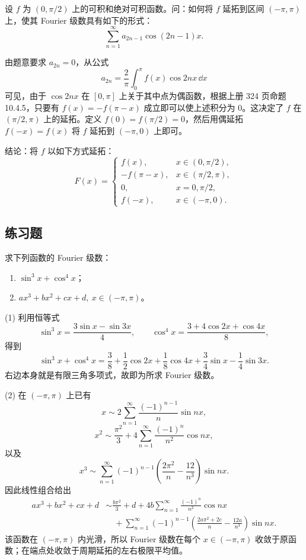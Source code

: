 \begin{xexample}[15.1.3]
设 $f$ 为 $(0,\pi/2)$ 上的可积和绝对可积函数。问：如何将 $f$ 延拓到区间 $(-\pi,\pi)$ 上，使其 Fourier 级数具有如下的形式：
\[
  \sum_{n=1}^{\infty}a_{2n-1}\cos(2n-1)x.
\]
\end{xexample}
\begin{xsolution}
由题意要求 $a_{2n}=0$，从公式
\[
  a_{2n}=\frac2\pi\int_0^{\pi}f(x)\cos2nx\,\dd x
\]
可见，由于 $\cos2nx$ 在 $[0,\pi]$ 上关于其中点为偶函数，根据上册 324 页命题 10.4.5，只要有 $f(x)=-f(\pi-x)$ 成立即可以使上述积分为 0。这决定了 $f$ 在 $(\pi/2,\pi)$ 上的延拓。定义 $f(0)=f(\pi/2)=0$，然后用偶延拓 $f(-x)=f(x)$ 将 $f$ 延拓到 $(-\pi,0)$ 上即可。

结论：将 $f$ 以如下方式延拓：
\[
  F(x)=
  \begin{cases}
    f(x),&x\in(0,\pi/2),\\
    -f(\pi-x),&x\in(\pi/2,\pi),\\
    0,&x=0,\pi/2,\\
    f(-x),&x\in(-\pi,0).
  \end{cases}
\]
\end{xsolution}

\subsection{练习题}

\begin{xexercise}[1]
求下列函数的 Fourier 级数：
  \begin{enumerate}[label=(\arabic*)]
    \item $\sin^3x+\cos^4x$；
    \item $ax^3+bx^2+cx+d,\ x\in(-\pi,\pi)$。
  \end{enumerate}
\end{xexercise}
\begin{xsolution}
(1) 利用恒等式
\[
  \sin^3x=\frac{3\sin x-\sin3x}{4},\qquad
  \cos^4x=\frac{3+4\cos2x+\cos4x}{8},
\]
得到
\[
  \sin^3x+\cos^4x
  =\frac38+\frac12\cos2x+\frac18\cos4x
   +\frac34\sin x-\frac14\sin3x.
\]
右边本身就是有限三角多项式，故即为所求 Fourier 级数。

(2) 在 $(-\pi,\pi)$ 上已有
\[
  x\sim2\sum_{n=1}^{\infty}\frac{(-1)^{n-1}}n\sin nx,
\]
\[
  x^2\sim\frac{\pi^2}{3}+4\sum_{n=1}^{\infty}\frac{(-1)^n}{n^2}\cos nx,
\]
以及
\[
  x^3\sim\sum_{n=1}^{\infty}(-1)^{n-1}
  \left(\frac{2\pi^2}{n}-\frac{12}{n^3}\right)\sin nx.
\]
因此线性组合给出
\begin{align*}
  ax^3+bx^2+cx+d
  &\sim \frac{b\pi^2}{3}+d
   +4b\sum_{n=1}^{\infty}\frac{(-1)^n}{n^2}\cos nx\\
  &\quad+
  \sum_{n=1}^{\infty}(-1)^{n-1}
  \left(\frac{2a\pi^2+2c}{n}-\frac{12a}{n^3}\right)\sin nx.
\end{align*}
该函数在 $(-\pi,\pi)$ 内光滑，所以 Fourier 级数在每个 $x\in(-\pi,\pi)$ 收敛于原函数；在端点处收敛于周期延拓的左右极限平均值。
\end{xsolution}


